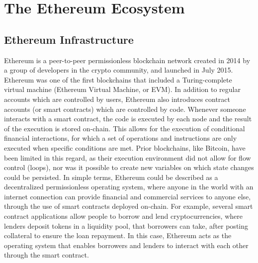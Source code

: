 \documentclass[No]{AEA}
\begin{document}
\section{The Ethereum Ecosystem}


\subsection{Ethereum Infrastructure}


Ethereum is a peer-to-peer permissionless blockchain network created in 2014 by a group of developers in the crypto community, and launched in July 2015. Ethereum was one of the first blockchains that included a Turing-complete virtual machine (Ethereum Virtual Machine, or EVM). In addition to regular accounts which are controlled by users, Ethereum also introduces contract accounts (or smart contracts) which are controlled by code. Whenever someone interacts with a smart contract, the code is executed by each node and the result of the execution is stored on-chain. This allows for the execution of conditional financial interactions, for which a set of operations and instructions are only executed when specific conditions are met. Prior blockchains, like Bitcoin, have been limited in this regard, as their execution environment did not allow for flow control (loops), nor was it possible to create new variables on which state changes could be persisted. In simple terms, Ethereum could be described as a decentralized permissionless operating system, where anyone in the world with an internet connection can provide financial and commercial services to anyone else, through the use of smart contracts deployed on-chain. For example, several smart contract applications allow people to borrow and lend cryptocurrencies, where lenders deposit tokens in a liquidity pool, that borrowers can take, after posting collateral to ensure the loan repayment. In this case, Ethereum acts as the operating system that enables borrowers and lenders to interact with each other through the smart contract.
\end{document}
